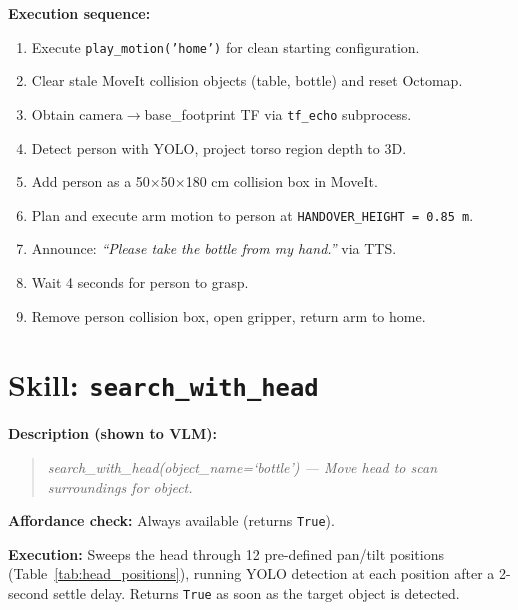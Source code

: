 \documentclass[12pt,a4paper]{report}
\begin{document}
\textbf{Execution sequence:}
\begin{enumerate}[noitemsep]
  \item Execute \texttt{play\_motion('home')} for clean starting configuration.
  \item Clear stale MoveIt collision objects (table, bottle) and reset Octomap.
  \item Obtain camera$\to$base\_footprint TF via \texttt{tf\_echo} subprocess.
  \item Detect person with YOLO, project torso region depth to 3D.
  \item Add person as a 50$\times$50$\times$180 cm collision box in MoveIt.
  \item Plan and execute arm motion to person at \texttt{HANDOVER\_HEIGHT = 0.85 m}.
  \item Announce: \emph{``Please take the bottle from my hand.''} via TTS.
  \item Wait 4 seconds for person to grasp.
  \item Remove person collision box, open gripper, return arm to home.
\end{enumerate}

\section{Skill: \texttt{search\_with\_head}}

\textbf{Description (shown to VLM):}
\begin{quote}
\textit{search\_with\_head(object\_name=`bottle') — Move head to scan surroundings for object.}
\end{quote}

\textbf{Affordance check:} Always available (returns \texttt{True}).

\textbf{Execution:} Sweeps the head through 12 pre-defined pan/tilt positions
(Table~\ref{tab:head_positions}), running YOLO detection at each position after a 2-second
settle delay.  Returns \texttt{True} as soon as the target object is detected.
\end{document}

